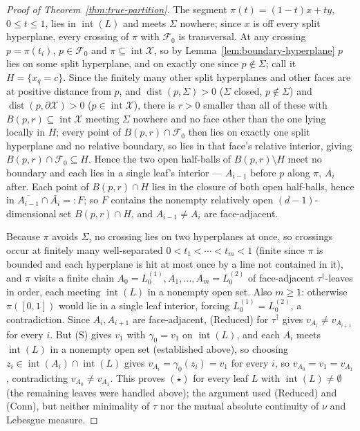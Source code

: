 \documentclass[11pt]{article}
\theoremstyle{plain}
\theoremstyle{definition}
\theoremstyle{remark}
\newcommand{\cX}{\mathcal{X}}
\newcommand{\cF}{\mathcal{F}}
\begin{document}
\begin{proof}[Proof of Theorem~\ref{thm:true-partition}]
The segment \(\pi(t)=(1-t)x+ty\), \(0\le t\le1\), lies in
\(\operatorname{int}(L)\) and meets \(\Sigma\) nowhere; since \(x\) is off
every split hyperplane, every crossing of \(\pi\) with \(\cF_0\) is
transversal. At any crossing \(p=\pi(t_i)\), \(p\in\cF_0\) and
\(\pi\subseteq\operatorname{int}\cX\), so by Lemma~\ref{lem:boundary-hyperplane}
\(p\) lies on some split hyperplane, and on exactly one since \(p\notin\Sigma\);
call it \(H=\{x_q=c\}\). Since the finitely many other split hyperplanes
and other faces are at positive distance from \(p\), and
\(\operatorname{dist}(p,\Sigma)>0\) (\(\Sigma\) closed, \(p\notin\Sigma\))
and \(\operatorname{dist}(p,\partial\cX)>0\) (\(p\in\operatorname{int}\cX\)),
there is \(r>0\) smaller than all of these with
\(B(p,r)\subseteq\operatorname{int}\cX\) meeting \(\Sigma\) nowhere and no
face other than the one lying locally in \(H\); every point of
\(B(p,r)\cap\cF_0\) then lies on exactly one split hyperplane and no
relative boundary, so lies in that face's relative interior, giving
\(B(p,r)\cap\cF_0\subseteq H\). Hence the two open half-balls of
\(B(p,r)\setminus H\) meet no boundary and each lies in a single leaf's
interior --- \(A_{i-1}\) before \(p\) along \(\pi\), \(A_i\) after. Each
point of \(B(p,r)\cap H\) lies in the closure of both open half-balls,
hence in \(\overline{A_{i-1}}\cap\overline{A_i}=:F\); so \(F\) contains the
nonempty relatively open \((d-1)\)-dimensional set \(B(p,r)\cap H\), and
\(A_{i-1}\ne A_i\) are face-adjacent.

Because \(\pi\) avoids \(\Sigma\), no crossing lies on two hyperplanes at
once, so crossings occur at finitely many well-separated
\(0<t_1<\cdots<t_m<1\) (finite since \(\pi\) is bounded and each hyperplane
is hit at most once by a line not contained in it), and \(\pi\) visits a
finite chain \(A_0=L_0^{(1)},A_1,\ldots,A_m=L_0^{(2)}\) of face-adjacent
\(\tau^{\dagger}\)-leaves in order, each meeting \(\operatorname{int}(L)\)
in a nonempty open set. Also \(m\ge1\): otherwise \(\pi([0,1])\) would lie
in a single leaf interior, forcing \(L_0^{(1)}=L_0^{(2)}\), a contradiction.
Since \(A_i,A_{i+1}\) are face-adjacent, (Reduced) for \(\tau^{\dagger}\)
gives \(v_{A_i}\ne v_{A_{i+1}}\) for every \(i\). But (S) gives \(v_1\) with
\(\gamma_0=v_1\) on \(\operatorname{int}(L)\), and each \(A_i\) meets
\(\operatorname{int}(L)\) in a nonempty open set (established above), so
choosing \(z_i\in\operatorname{int}(A_i)\cap\operatorname{int}(L)\)
gives \(v_{A_i}=\gamma_0(z_i)=v_1\) for every \(i\), so
\(v_{A_0}=v_1=v_{A_1}\), contradicting \(v_{A_0}\ne v_{A_1}\). This proves
\((\star)\) for every leaf \(L\) with \(\operatorname{int}(L)\ne\emptyset\)
(the remaining leaves were handled above); the argument used (Reduced) and
(Conn), but neither minimality of \(\tau\) nor the mutual absolute
continuity of \(\nu\) and Lebesgue measure.


\end{proof}
\end{document}
